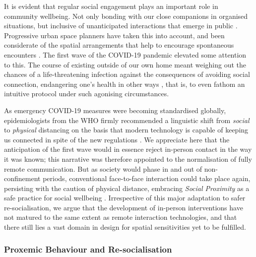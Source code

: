 It is evident that regular social engagement plays an important role in community wellbeing. Not only bonding with our close companions in organised situations, but inclusive of unanticipated interactions that emerge in public \citep{ang_your_2021,simoes_aelbrecht_rethinking_2010,sugiyama_associations_2008}. Progressive urban space planners have taken this into account, and been considerate of the spatial arrangements that help to encourage spontaneous encounters \citep{latham_social_2019,okkels_urban_2018,mehta_look_2009}. The first wave of the COVID-19 pandemic elevated some attention to this. The course of existing outside of our own home meant weighing out the chances of a life-threatening infection against the consequences of avoiding social connection, endangering one's health in other ways \citep{brooks_psychological_2020,rivera_effects_2020,zorzo_adult_2019,evans_social_2019}, that is, to even fathom an intuitive protocol under such agonising circumstances.

As emergency COVID-19 measures were becoming standardised globally, epidemiologists from the WHO firmly recommended a linguistic shift from \textit{social} to \textit{physical} distancing on the basis that modern technology is capable of keeping us connected in spite of the new regulations \citep{romania_interactional_2020}. We appreciate here that the anticipation of the first wave would in essence reject in-person contact in the way it was known; this narrative was therefore appointed to the normalisation of fully remote communication. But as society would phase in and out of non-confinement periods, conventional face-to-face interaction could take place again, persisting with the caution of physical distance, embracing \textit{Social Proximity} as a safe practice for social wellbeing \cite{long_covid-19_2021}. Irrespective of this major adaptation to safer re-socialisation, we argue that the development of in-person interventions have not matured to the same extent as remote interaction technologies, and that there still lies a vast domain in design for spatial sensitivities yet to be fulfilled.

\subsubsection{Proxemic Behaviour and Re-socialisation}
\label{subsec:Proxemic}

